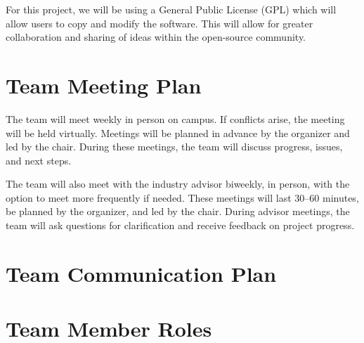 \documentclass{article}
\begin{document}
For this project, we will be using a General Public License (GPL) which will allow users to copy and modify the software. This will allow for greater collaboration and sharing of ideas within the open-source community.

\section{Team Meeting Plan}

The team will meet weekly in person on campus. If conflicts arise, the meeting will be held virtually. Meetings will be planned in advance by the organizer and led by the chair. During these meetings, the team will discuss progress, issues, and next steps.

The team will also meet with the industry advisor biweekly, in person, with the option to meet more frequently if needed. These meetings will last 30–60 minutes, be planned by the organizer, and led by the chair. During advisor meetings, the team will ask questions for clarification and receive feedback on project progress.







\section{Team Communication Plan}


\section{Team Member Roles}

\end{document}
